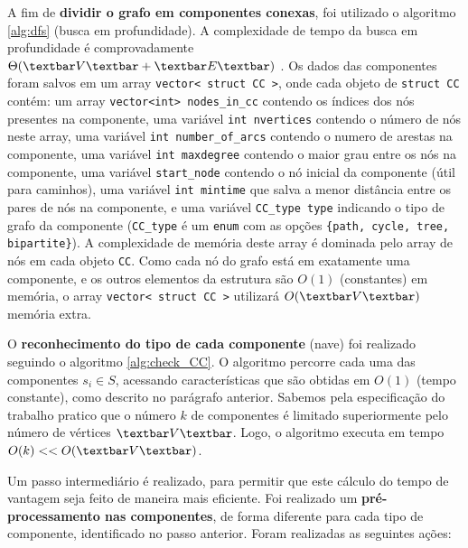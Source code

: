 A fim de \textbf{dividir o grafo em componentes conexas}, foi utilizado o algoritmo \ref{alg:dfs} (busca em profundidade). A complexidade de tempo da busca em profundidade é comprovadamente $\Theta(\textbar V \textbar + \textbar E \textbar)$ \cite{cormen2009introduction}. Os dados das componentes foram salvos em um array \texttt{vector< struct CC >}, onde cada objeto de \texttt{struct CC} contém: um array \texttt{vector<int> nodes\_in\_cc} contendo os índices dos nós presentes na componente, uma variável \texttt{int nvertices} contendo o número de nós neste array, uma variável \texttt{int number\_of\_arcs} contendo o numero de arestas na componente, uma variável \texttt{int maxdegree} contendo o maior grau entre os nós na componente, uma variável \texttt{start\_node} contendo o nó inicial da componente (útil para caminhos), uma variável \texttt{int mintime} que salva a menor distância entre os pares de nós na componente, e uma variável \texttt{CC\_type type} indicando o tipo de grafo da componente (\texttt{CC\_type} é um \texttt{enum} com as opções \texttt{\{path, cycle, tree, bipartite\}}). A complexidade de memória deste array é dominada pelo array de nós em cada objeto \texttt{CC}. Como cada nó do grafo está em exatamente uma componente, e os outros elementos da estrutura são $O(1)$ (constantes) em memória, o array \texttt{vector< struct CC >} utilizará $O(\textbar V \textbar)$ memória extra.

O \textbf{reconhecimento do tipo de cada componente }(nave) foi realizado seguindo o algoritmo \ref{alg:check_CC}. O algoritmo percorre cada uma das componentes $s_i \in S$, acessando características que são obtidas em $O(1)$ (tempo constante), como descrito no parágrafo anterior. Sabemos pela especificação do trabalho pratico que o número $k$ de componentes é limitado superiormente pelo número de vértices $\textbar V \textbar$. Logo, o algoritmo executa em tempo $O(k) << O(\textbar V \textbar)$.

Um passo intermediário é realizado, para permitir que este cálculo do tempo de vantagem seja feito de maneira mais eficiente. Foi realizado um \textbf{pré-processamento nas componentes}, de forma diferente para cada tipo de componente, identificado no passo anterior. Foram realizadas as seguintes ações: 

